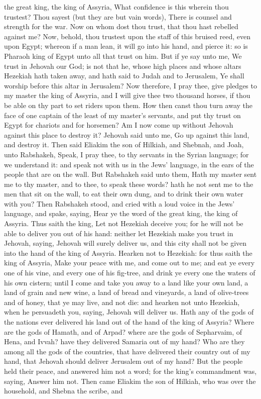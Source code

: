 the great king, the king of Assyria, What confidence is this wherein thou trustest? Thou sayest (but they are but vain words), There is counsel and strength for the war. Now on whom dost thou trust, that thou hast rebelled against me? Now, behold, thou trustest upon the staff of this bruised reed, even upon Egypt; whereon if a man lean, it will go into his hand, and pierce it: so is Pharaoh king of Egypt unto all that trust on him. But if ye say unto me, We trust in Jehovah our God; is not that he, whose high places and whose altars Hezekiah hath taken away, and hath said to Judah and to Jerusalem, Ye shall worship before this altar in Jerusalem? Now therefore, I pray thee, give pledges to my master the king of Assyria, and I will give thee two thousand horses, if thou be able on thy part to set riders upon them. How then canst thou turn away the face of one captain of the least of my master’s servants, and put thy trust on Egypt for chariots and for horsemen? Am I now come up without Jehovah against this place to destroy it? Jehovah said unto me, Go up against this land, and destroy it.  Then said Eliakim the son of Hilkiah, and Shebnah, and Joah, unto Rabshakeh, Speak, I pray thee, to thy servants in the Syrian language; for we understand it: and speak not with us in the Jews’ language, in the ears of the people that are on the wall. But Rabshakeh said unto them, Hath my master sent me to thy master, and to thee, to speak these words? hath he not sent me to the men that sit on the wall, to eat their own dung, and to drink their own water with you? Then Rabshakeh stood, and cried with a loud voice in the Jews’ language, and spake, saying, Hear ye the word of the great king, the king of Assyria. Thus saith the king, Let not Hezekiah deceive you; for he will not be able to deliver you out of his hand: neither let Hezekiah make you trust in Jehovah, saying, Jehovah will surely deliver us, and this city shall not be given into the hand of the king of Assyria. Hearken not to Hezekiah: for thus saith the king of Assyria, Make your peace with me, and come out to me; and eat ye every one of his vine, and every one of his fig-tree, and drink ye every one the waters of his own cistern; until I come and take you away to a land like your own land, a land of grain and new wine, a land of bread and vineyards, a land of olive-trees and of honey, that ye may live, and not die: and hearken not unto Hezekiah, when he persuadeth you, saying, Jehovah will deliver us. Hath any of the gods of the nations ever delivered his land out of the hand of the king of Assyria? Where are the gods of Hamath, and of Arpad? where are the gods of Sepharvaim, of Hena, and Ivvah? have they delivered Samaria out of my hand? Who are they among all the gods of the countries, that have delivered their country out of my hand, that Jehovah should deliver Jerusalem out of my hand?  But the people held their peace, and answered him not a word; for the king’s commandment was, saying, Answer him not. Then came Eliakim the son of Hilkiah, who was over the household, and Shebna the scribe, and 
